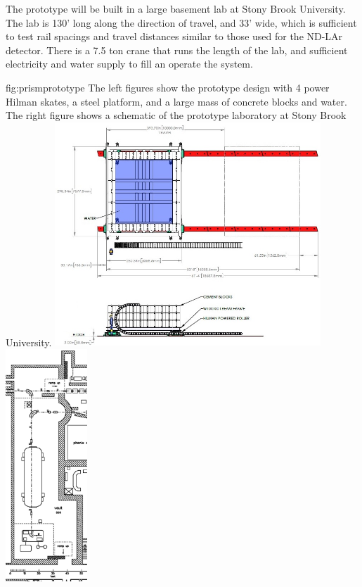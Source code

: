 The prototype will be built in a large basement lab at Stony Brook University. The lab is 130' long along the direction of travel, and 33' wide, which is sufficient to test rail spacings and travel distances similar to those used for the ND-LAr detector. There is a 7.5 ton crane that runs the length of the lab, and sufficient electricity and water supply to fill an operate the system.


\begin{dunefigure}{fig:prismprototype}
{The left figures show the prototype design with 4 power Hilman skates, a steel platform, and a large mass of concrete blocks and water. The right figure shows a schematic of the prototype laboratory at Stony Brook University.}
\includegraphics[width=0.75\textwidth]{graphics/prism/prismprototype.jpg}
\includegraphics[width=0.23\textwidth]{graphics/prism/sbulab.jpg}

\end{dunefigure}


